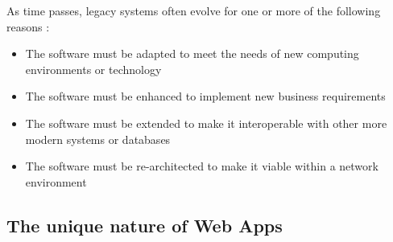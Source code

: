 \documentclass{article}
\begin{document}
	\noindent As time passes, legacy systems often evolve for one or more of the following reasons :
	\begin{itemize}
		\item The software must be adapted to meet the needs of new computing environments or technology
		\item The software must be enhanced to implement new business requirements
		\item The software must be extended to make it interoperable with other more modern systems or databases
		\item The software must be re-architected to make it viable within a network environment
	\end{itemize} \newpage

	\subsection{The unique nature of Web Apps}
\end{document}
